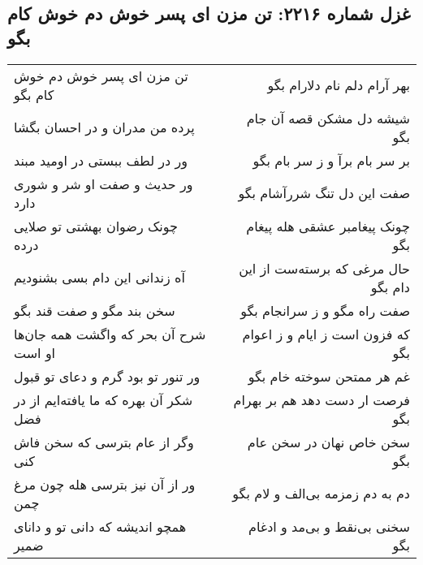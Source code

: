 \begin{center}
\section*{غزل شماره ۲۲۱۶: تن مزن ای پسر خوش دم خوش کام بگو}
\label{sec:2216}
\begin{longtable}{l p{0.5cm} r}
تن مزن ای پسر خوش دم خوش کام بگو
&&
بهر آرام دلم نام دلارام بگو
\\
پرده من مدران و در احسان بگشا
&&
شیشه دل مشکن قصه آن جام بگو
\\
ور در لطف ببستی در اومید مبند
&&
بر سر بام برآ و ز سر بام بگو
\\
ور حدیث و صفت او شر و شوری دارد
&&
صفت این دل تنگ شررآشام بگو
\\
چونک رضوان بهشتی تو صلایی درده
&&
چونک پیغامبر عشقی هله پیغام بگو
\\
آه زندانی این دام بسی بشنودیم
&&
حال مرغی که برسته‌ست از این دام بگو
\\
سخن بند مگو و صفت قند بگو
&&
صفت راه مگو و ز سرانجام بگو
\\
شرح آن بحر که واگشت همه جان‌ها او است
&&
که فزون است ز ایام و ز اعوام بگو
\\
ور تنور تو بود گرم و دعای تو قبول
&&
غم هر ممتحن سوخته خام بگو
\\
شکر آن بهره که ما یافته‌ایم از در فضل
&&
فرصت ار دست دهد هم بر بهرام بگو
\\
وگر از عام بترسی که سخن فاش کنی
&&
سخن خاص نهان در سخن عام بگو
\\
ور از آن نیز بترسی هله چون مرغ چمن
&&
دم به دم زمزمه بی‌الف و لام بگو
\\
همچو اندیشه که دانی تو و دانای ضمیر
&&
سخنی بی‌نقط و بی‌مد و ادغام بگو
\\
\end{longtable}
\end{center}

